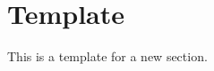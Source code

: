 \section{Template}
\label{sectionX}
\renewcommand*{\runninghead}{\nameref{sectionX}}

This is a template for a new section.

\clearpage